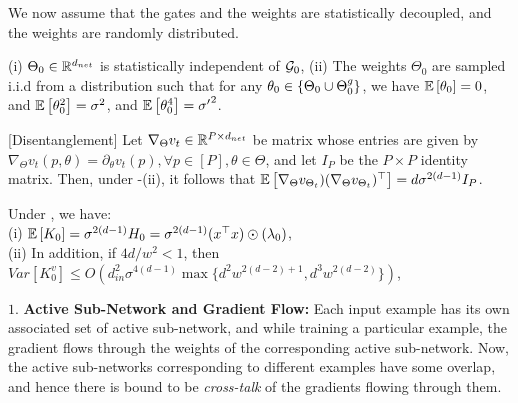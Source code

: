 We now assume that the gates and the weights are statistically decoupled, and the weights are randomly distributed.
\begin{assumption}\label{assmp:main}
(i) $\Theta_0\in\mathbb{R}^{d_{net}}$  is statistically independent of $\mathcal{G}_0$, (ii) The weights $\Theta_0$ are sampled i.i.d from a distribution such that for any $\theta_0\in\{\Theta_0\cup {\Theta}^g_0\}$,  we have $\mathbb{E}\left[\theta_0\right]=0$, and  $\mathbb{E}\left[\theta^2_0\right]=\sigma^2$, and $\mathbb{E}\left[\theta^4_0\right]={\sigma'}^2$.
\end{assumption}
\begin{lemma}\label{lm:disentangle}[Disentanglement] Let $\nabla_{\Theta} v_t\in \mathbb{R}^{P\times d_{net}}$ be matrix whose entries are given by $\nabla_{\Theta} v_t (p,\theta)=\partial_{\theta}v_t(p),\forall p\in [P], \theta\in\Theta$, and let $I_P$ be the $P\times P$ identity matrix. Then, 
under -(ii), it follows that $\mathbb{E}\left[\nabla_{\Theta}v_{\Theta_t})(\nabla_{\Theta}v_{\Theta_t})^\top \right]= d\sigma^{2(d-1)}I_{P}$.
\end{lemma}
\begin{theorem}\label{th:main} Under , we have:\\
(i) $\mathbb{E}\left[K_0\right]=\sigma^{2(d-1)}H_0=\sigma^{2(d-1)}(x^\top x)\odot(\lambda_0)$,\\
(ii) In addition, if ${4d}/{w^2}<1$, then $Var\left[K^v_0\right]\leq O\left(d^2_{in}\sigma^{4(d-1)}\max\{d^2w^{2(d-2)+1}, d^3w^{2(d-2)}\}\right)$,\\
\end{theorem}

$1.$ \textbf{Active Sub-Network and Gradient Flow:}  Each input example has its own associated set of active sub-network, and while training a particular example, the gradient flows through the weights of the corresponding active sub-network. Now, the active sub-networks corresponding to different examples have some overlap, and hence there is bound to be \emph{cross-talk} of the gradients flowing through them. %
